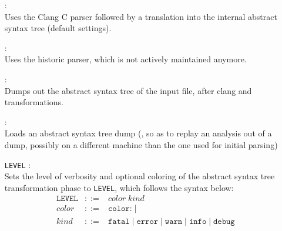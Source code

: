 \begin{itemize}
\item[\doption{-clang-parser}] \optadv: \\
  Uses the Clang C parser followed by a translation into the \memcad
  internal abstract syntax tree (default settings).
\item[\doption{-old-parser}] \optadv: \\
  Uses the historic \memcad parser, which is not actively maintained
  anymore.
\item[\doption{-dump-parse}] \optadv: \\
  Dumps out the abstract syntax tree of the input file, after clang and
  transformations.
\item[\doption{-load-dump}] \optadv: \\
  Loads an abstract syntax tree dump (\eg, so as to replay an analysis
  out of a dump, possibly on a different machine than the one used for
  initial parsing)
\item[\doption{-tlog} \texttt{LEVEL}] \optdev: \\
  Sets the level of verbosity and optional coloring of the abstract
  syntax tree transformation phase to \texttt{LEVEL}, which follows
  the syntax below:
  \[
  \begin{array}{rcl}
    \texttt{LEVEL} & ::= & color \; kind \\
    color & ::= & \texttt{color:} \; | \; \\
    kind  & ::= & \texttt{fatal} \; | \; \texttt{error} \; | \;
    \texttt{warn} \; | \; \texttt{info} \; | \; \texttt{debug} \\
  \end{array}
  \]
\end{itemize}

